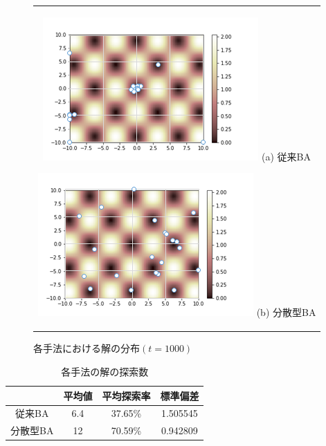 \documentclass{jarticle}
\begin{document}
\begin{figure}[h]
\begin{center}
\begin{tabular}{c}

\begin{minipage}[b]{0.45\linewidth}
\begin{center}
\includegraphics[keepaspectratio, scale=0.4]{obat01.bmp} (a) 従来BA
\end{center}
\end{minipage}

\begin{minipage}[b]{0.45\linewidth}
\begin{center}
\includegraphics[keepaspectratio, scale=0.4]{sbat01.bmp} (b) 分散型BA
\end{center}
\end{minipage}

\end{tabular}
\caption{各手法における解の分布${(t=1000)}$}
\label{fig:pbest_position}
\end{center}
\end{figure}

\begin{table}
\begin{center}
\caption{各手法の解の探索数}
\label{tab1}
\begin{tabular}{cccc}\hline
 &平均値 &平均探索率  &標準偏差\\  \hline\hline
従来BA & 6.4 & 37.65\% &1.505545 \\ 
分散型BA & 12 & 70.59\% &0.942809 \\ \hline
\end{tabular}
\end{center}
\end{table}
\end{document}
